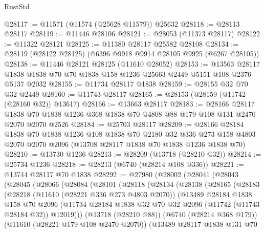 \begin{lexlean}{RustStd}
\begin{coremodule}
@28117 := @11571 (@11574 (@25628 @11579)) @25632
@28118 := @28113 @28117
@28119 := @11446 @28106
@28121 := @28053 (@11373 @28117)
@28122 := @11322 @28121
@28125 := @11380 @28117 @25582 @28108
@28134 := @28119 (@28122 @28125) (@6396 @9918 @9914 @28105 @9925 (@6267 @28105))
@28138 := @11446 @28121 @28125 (@11610 @28052)
@28153 := @13563
    @28117
    @1838
    @1838
    @70
    @70
    @1838
    @158
    @1236
    @25663
    @2449
    @5151
    @108
    @2376
    @5137
    @2032
@28155 := @11734 @28117 @1838
@28159 := @28155 @32 @70 @32 @2449
@28160 := @11743 @28117
@28165 := @28153 (@28159 (@11742 (@28160 @32)) @13617)
@28166 := @13663 @28117
@28183 := @28166
    @28117
    @1838
    @70
    @1838
    @1236
    @368
    @1838
    @70
    @4808
    @88
    @179
    @108
    @131
    @2470
    @2070
    @2070
    @2526
@28184 := @25703 @28117
@28209 := @28166
    @28184
    @1838
    @70
    @1838
    @1236
    @108
    @1838
    @70
    @2180
    @32
    @336
    @273
    @158
    @4803
    @2070
    @2070
    @2096
    (@13708 @28117 @1838 @70 @1838 @1236 @1838 @70)
@28210 := @13730 @1236
@28213 := @28209 (@13718 (@28210 @32))
@28214 := @25734 @1236
@28218 := @28213 (@6740 (@28214 @108 @336))
@28221 := @13744 @28117 @70 @1838
@28292 := @27980
    (@28002
      (@28041
        (@28043
          (@28045
            (@28066
              (@28084
                (@28101
                  (@28118
                    (@28134
                      (@28138
                        (@28165
                          (@28183
                            (@28218
                              (@11610 (@28221 @336 @273 @4803 @2070))
                              (@13489
                                @28184
                                @1838
                                @158
                                @70
                                @2096
                                (@11734
                                  @28184
                                  @1838
                                  @32
                                  @70
                                  @32
                                  @2096
                                  (@11742 (@11743 @28184 @32))
                                  @12019)))
                            (@13718 (@28210 @88))
                            (@6740 (@28214 @368 @179))
                            (@11610 (@28221 @179 @108 @2470 @2070))
                            (@13489
                              @28117
                              @1838
                              @131
                              @70

\end{coremodule}
\end{lexlean}
